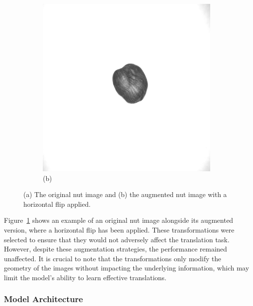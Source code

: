 \documentclass[12pt,DIV14,BCOR12mm,a4paper,footinclude=false,headinclude,parskip=half-,twoside,openright,cleardoublepage=empty,toc=index,bibliography=totoc,listof=totoc]{scrreprt}
\numberwithin{equation}{chapter}
\begin{document}
\begin{figure}
\begin{subfigure}[b]{0.45\textwidth}
        \includegraphics[scale=0.15]{../media/augmented_horizontal_flip.png} %
        \caption*{(b)}
    \end{subfigure}
    \caption{(a) The original nut image and (b) the augmented nut image with a horizontal flip applied.}
    \label{fig:nut_comparison}
\end{figure}

Figure~\ref{fig:nut_comparison} shows an example of an original nut image alongside its augmented version, where a horizontal flip has been applied.
These transformations were selected to ensure that they would not adversely affect the translation task. However, despite these augmentation strategies, the performance remained unaffected. It is crucial to note that the transformations only modify the geometry of the images without impacting the underlying information, which may limit the model's ability to learn effective translations.

\subsubsection{Model Architecture}
\end{document}
